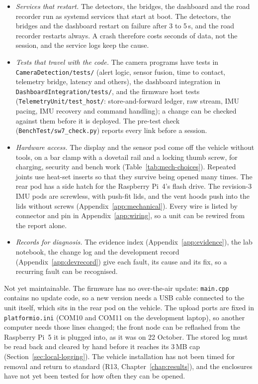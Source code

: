 \begin{itemize}
\item \emph{Services that restart.} The detectors, the bridges, the dashboard and the road recorder run as systemd services that start at boot. The detectors, the bridges and the dashboard restart on failure after 3 to 5\,s, and the road recorder restarts always. A crash therefore costs seconds of data, not the session, and the service logs keep the cause.
\item \emph{Tests that travel with the code.} The camera programs have tests in \texttt{CameraDetection/\allowbreak{}\allowbreak tests/} (alert logic, sensor fusion, time to contact, telemetry bridge, latency and others), the dashboard integration in \texttt{DashboardIntegration/\allowbreak{}\allowbreak tests/}, and the firmware host tests (\texttt{TelemetryUnit/\allowbreak{}\allowbreak test\_\allowbreak{}host/}: store-and-forward ledger, raw stream, IMU pacing, IMU recovery and command handling); a change can be checked against them before it is deployed. The pre-test check (\texttt{BenchTest/\allowbreak{}\allowbreak sw7\_\allowbreak{}check.py}) reports every link before a session.
\item \emph{Hardware access.} The display and the sensor pod come off the vehicle without tools, on a bar clamp with a dovetail rail and a locking thumb screw, for charging, security and bench work (Table~\ref{tab:mech-choices}). Repeated joints use heat-set inserts so that they survive being opened many times. The rear pod has a side hatch for the Raspberry Pi~4's flash drive. The revision-3 IMU pods are screwless, with push-fit lids, and the vent hoods push into the lids without screws (Appendix~\ref{app:mechanical}). Every wire is listed by connector and pin in Appendix~\ref{app:wiring}, so a unit can be rewired from the report alone.
\item \emph{Records for diagnosis.} The evidence index (Appendix~\ref{app:evidence}), the lab notebook, the change log and the development record (Appendix~\ref{app:devrecord}) give each fault, its cause and its fix, so a recurring fault can be recognised.
\end{itemize}

Not yet maintainable. The firmware has no over-the-air update: \texttt{main.cpp} contains no update code, so a new version needs a USB cable connected to the unit itself, which sits in the rear pod on the vehicle. The upload ports are fixed in \texttt{platformio.ini} (COM10 and COM11 on the development laptop), so another computer needs those lines changed; the front node can be reflashed from the Raspberry Pi~5 it is plugged into, as it was on 22 October. The stored log must be read back and cleared by hand before it reaches its 3\,MB cap (Section~\ref{sec:local-logging}). The vehicle installation has not been timed for removal and return to standard (R13, Chapter~\ref{chap:results}), and the enclosures have not yet been tested for how often they can be opened.

